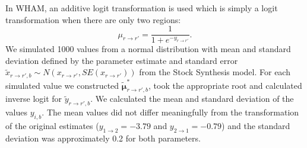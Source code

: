 \documentclass[
]{article}
\begin{document}
In WHAM, an additive logit transformation is used which is simply a
logit transformation when there are only two regions: \[
\mu_{r\rightarrow r'} = \frac{1}{1+e^{-y_{r\rightarrow r'}}}.
\] We simulated 1000 values from a normal distribution with mean and
standard deviation defined by the parameter estimate and standard error
\(\tilde x_{{r\rightarrow r'},b} \sim N(x_{r\rightarrow r'}, SE(x_{r\rightarrow r'}))\)
from the Stock Synthesis model. For each simulated value we constructed
\(\tilde {\boldsymbol{\mu}}^*_{{r\rightarrow r'},b}\), took the
appropriate root and calculated inverse logit for
\(\tilde y_{{r\rightarrow r'},b}\). We calculated the mean and standard
deviation of the values \(y_{i,b}\). The mean values did not differ
meaningfully from the transformation of the original estimates
(\(y_{1\rightarrow 2} = -3.79\) and \(y_{2\rightarrow 1} = -0.79\)) and
the standard deviation was approximately 0.2 for both parameters.
\end{document}
